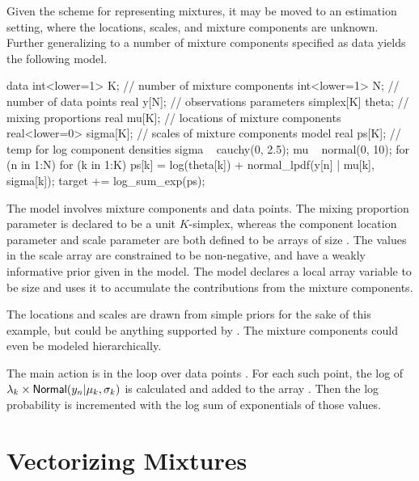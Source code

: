Given the scheme for representing mixtures, it may be moved to an
estimation setting, where the locations, scales, and mixture
components are unknown.  Further generalizing to a number of mixture
components specified as data yields the following model.
%
\begin{stancode}
data {
  int<lower=1> K;          // number of mixture components
  int<lower=1> N;          // number of data points
  real y[N];               // observations
}
parameters {
  simplex[K] theta;        // mixing proportions
  real mu[K];              // locations of mixture components
  real<lower=0> sigma[K];  // scales of mixture components
}
model {
  real ps[K];              // temp for log component densities
  sigma ~ cauchy(0, 2.5);
  mu ~ normal(0, 10);
  for (n in 1:N) {
    for (k in 1:K) {
      ps[k] = log(theta[k]) 
               + normal_lpdf(y[n] | mu[k], sigma[k]);
    }
    target += log_sum_exp(ps);
  }
}
\end{stancode}
%
The model involves  mixture components and  data
points. The mixing proportion parameter  is declared to be
a unit $K$-simplex, whereas the component location parameter 
and scale parameter  are both defined to be arrays of size
. The values in the scale array  are constrained
to be non-negative, and have a weakly informative prior given in the
model. The model declares a local array variable  to be size
 and uses it to accumulate the contributions from the mixture
components.

The locations and scales are drawn from simple priors for the sake of
this example, but could be anything supported by \Stan.  The mixture
components  could even be modeled hierarchically.

The main action is in the loop over data points .  For each
such point, the log of $\lambda_k \times
\distro{Normal}(y_n|\mu_k,\sigma_k)$ is calculated and added to the
array .  Then the log probability is incremented with the log
sum of exponentials of those values.

\section{Vectorizing Mixtures}

